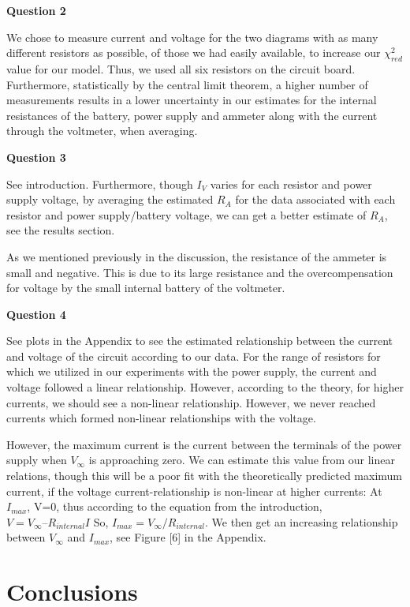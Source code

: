 \documentclass[letterpaper,12pt]{article}
\begin{document}
\textbf{Question 2}

We chose to measure current and voltage for the two diagrams with as 
many different resistors as possible, of those we had easily available, to 
increase our $\chi_{red}^2$ value for our model. Thus, we used all six resistors 
on the circuit board. Furthermore, statistically by the central limit theorem, 
a higher number of measurements results in a lower uncertainty in our estimates 
for the internal resistances of the battery, power supply and ammeter along with 
the current through the voltmeter, when averaging.

\textbf{Question 3}

See introduction. Furthermore, though $I_V$ varies for each resistor and power 
supply voltage, by averaging the estimated $R_A$ for the data associated with 
each resistor and power supply/battery voltage, we can get a better estimate of $R_A$, 
see the results section.

As we mentioned previously in the discussion, the resistance of the ammeter is 
small and negative. This is due to its large resistance and the overcompensation 
for voltage by the small internal battery of the voltmeter.

\textbf{Question 4}

See plots in the Appendix to see the estimated relationship between 
the current and voltage of the circuit according to our data. For the range 
of resistors for which we utilized in our experiments with the power supply, 
the current and voltage followed a linear relationship. However, according to 
the theory, for higher currents, we should see a non-linear relationship. 
However, we never reached currents which formed non-linear relationships with the voltage. 

However, the maximum current is the current between the terminals of the power supply when 
$V_{\infty}$ is approaching zero. We can estimate this value from our linear relations, 
though this will be a poor fit with the theoretically predicted maximum current, 
if the voltage current-relationship is non-linear at higher currents:
At $I_{max}$, V=0, thus according to the equation from the introduction, $V = V_{\infty} – R_{internal}I$
So, $I_{max} = V_{\infty}/R_{internal}$.
We then get an increasing relationship between $V_{\infty}$ and $I_{max}$, see Figure [6] in 
the Appendix.


\section{Conclusions}
\end{document}
